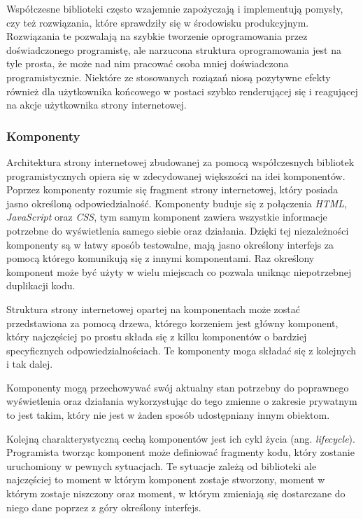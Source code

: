 \documentclass[polish, twoside, 12pt]{mwart}
\begin{document}
Współczesne biblioteki często wzajemnie zapożyczają i implementują pomysły, czy też rozwiązania, które sprawdziły się w środowisku produkcyjnym. Rozwiązania te pozwalają na szybkie tworzenie oprogramowania przez doświadczonego programistę, ale narzucona struktura oprogramowania jest na tyle prosta, że może nad nim pracować osoba mniej doświadczona programistycznie. Niektóre ze stosowanych roziązań niosą pozytywne efekty również dla użytkownika końcowego w postaci szybko renderującej się i reagującej na akcje użytkownika strony internetowej.

\subsubsection{Komponenty}

Architektura strony internetowej zbudowanej za pomocą współczesnych bibliotek programistycznych opiera się w zdecydowanej większości na idei komponentów. Poprzez komponenty rozumie się fragment strony internetowej, który posiada jasno określoną odpowiedzialność. Komponenty buduje się z połączenia \emph{HTML}, \emph{JavaScript} oraz \emph{CSS}, tym samym komponent zawiera wszystkie informacje potrzebne do wyświetlenia samego siebie oraz działania. Dzięki tej niezależności komponenty są w łatwy sposób testowalne, mają jasno określony interfejs za pomocą którego komunikują się z innymi komponentami. Raz określony komponent może być użyty w wielu miejscach co pozwala uniknąc niepotrzebnej duplikacji kodu.

Struktura strony internetowej opartej na komponentach może zostać przedstawiona za pomocą drzewa, którego korzeniem jest główny komponent, który najczęściej po prostu składa się z kilku komponentów o bardziej specyficznych odpowiedzialnościach. Te komponenty moga składać się z kolejnych i tak dalej. 

Komponenty mogą przechowywać swój aktualny stan potrzebny do poprawnego wyświetlenia oraz działania wykorzystując do tego zmienne o zakresie prywatnym to jest takim, który nie jest w żaden sposób udostępniany innym obiektom.

Kolejną charakterystyczną cechą komponentów jest ich cykl życia (ang. \emph{lifecycle}). Programista tworząc komponent może definiować fragmenty kodu, który zostanie uruchomiony w pewnych sytuacjach. Te sytuacje zależą od biblioteki ale najczęściej to moment w którym komponent zostaje stworzony, moment w którym zostaje niszczony oraz moment, w którym zmieniają się dostarczane do niego dane poprzez z góry określony interfejs.
\end{document}
